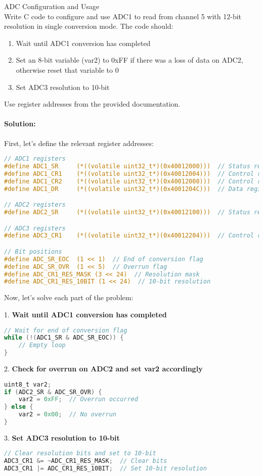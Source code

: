 \begin{example2}{ADC Configuration and Usage}\\
Write C code to configure and use ADC1 to read from channel 5 with 12-bit resolution in single conversion mode. The code should:

\begin{enumerate}
    \item Wait until ADC1 conversion has completed
    \item Set an 8-bit variable (var2) to 0xFF if there was a loss of data on ADC2, otherwise reset that variable to 0
    \item Set ADC3 resolution to 10-bit
\end{enumerate}

Use register addresses from the provided documentation.

\paragraph{Solution:}
First, let's define the relevant register addresses:
\begin{lstlisting}[language=C, style=basesmol]
// ADC1 registers
#define ADC1_SR     (*((volatile uint32_t*)(0x40012000)))  // Status register
#define ADC1_CR1    (*((volatile uint32_t*)(0x40012004)))  // Control register 1
#define ADC1_CR2    (*((volatile uint32_t*)(0x40012008)))  // Control register 2
#define ADC1_DR     (*((volatile uint32_t*)(0x4001204C)))  // Data register

// ADC2 registers
#define ADC2_SR     (*((volatile uint32_t*)(0x40012100)))  // Status register

// ADC3 registers
#define ADC3_CR1    (*((volatile uint32_t*)(0x40012204)))  // Control register 1

// Bit positions
#define ADC_SR_EOC  (1 << 1)  // End of conversion flag
#define ADC_SR_OVR  (1 << 5)  // Overrun flag
#define ADC_CR1_RES_MASK (3 << 24)  // Resolution mask
#define ADC_CR1_RES_10BIT (1 << 24)  // 10-bit resolution
\end{lstlisting}

Now, let's solve each part of the problem:

1. \textbf{Wait until ADC1 conversion has completed}
\begin{lstlisting}[language=C, style=basesmol]
// Wait for end of conversion flag
while (!(ADC1_SR & ADC_SR_EOC)) {
    // Empty loop
}
\end{lstlisting}

2. \textbf{Check for overrun on ADC2 and set var2 accordingly}
\begin{lstlisting}[language=C, style=basesmol]
uint8_t var2;
if (ADC2_SR & ADC_SR_OVR) {
    var2 = 0xFF;  // Overrun occurred
} else {
    var2 = 0x00;  // No overrun
}
\end{lstlisting}

3. \textbf{Set ADC3 resolution to 10-bit}
\begin{lstlisting}[language=C, style=basesmol]
// Clear resolution bits and set to 10-bit
ADC3_CR1 &= ~ADC_CR1_RES_MASK;  // Clear bits
ADC3_CR1 |= ADC_CR1_RES_10BIT;  // Set 10-bit resolution
\end{lstlisting}
\end{example2}

